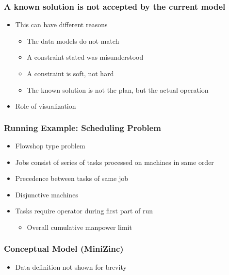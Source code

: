 \begin{frame}
\frametitle{A known solution is not accepted by the current model}
\begin{itemize}
\item This can have different reasons
\begin{itemize}
\item The data models do not match
\item A constraint stated was misunderstood
\item A constraint is soft, not hard
\item The known solution is not the plan, but the actual operation
\end{itemize}
\item Role of visualization
\end{itemize}
\end{frame}

\begin{frame}[label=running]
  \frametitle{Running Example: Scheduling Problem}
  \begin{itemize}
  \item Flowshop type problem
  \item Jobs consist of series of tasks processed on machines in same order
  \item Precedence between tasks of same job
  \item Disjunctive machines
  \item Tasks require operator during first part of run
  \begin{itemize}
      \item Overall cumulative manpower limit
  \end{itemize}
  \end{itemize}
\end{frame}

\begin{frame}[fragile,label=runningmodel]
\frametitle{Conceptual Model (MiniZinc)}

\begin{itemize}
    \item Data definition not shown for brevity
\end{itemize}
\end{frame}


